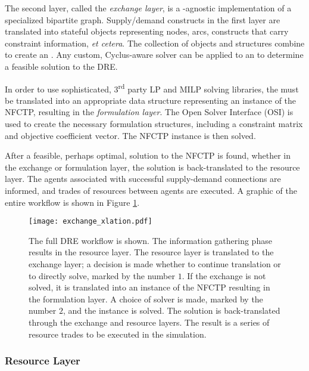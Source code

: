 The second layer, called the \textit{exchange layer}, is a
-agnostic implementation of a specialized bipartite
graph. Supply/demand constructs in the first layer are translated into stateful
objects representing nodes, arcs, constructs that carry constraint information,
\textit{et cetera}. The collection of objects and structures combine to create
an . Any custom, Cyclus-aware solver can be applied to an
 to determine a feasible solution to the DRE.

In order to use sophisticated, 3\textsuperscript{rd} party LP and MILP solving
libraries, the  must be translated into an appropriate data
structure representing an instance of the NFCTP, resulting in the
\textit{formulation layer}. The Open Solver Interface (OSI) \cite{coinosi} is
used to create the necessary formulation structures, including a constraint
matrix and objective coefficient vector. The NFCTP instance is then solved.

After a feasible, perhaps optimal, solution to the NFCTP is found, whether in
the exchange or formulation layer, the solution is back-translated to the
resource layer. The agents associated with successful supply-demand connections
are informed, and trades of resources between agents are executed. A graphic of
the entire workflow is shown in Figure \ref{fig:dre_impl}.

\begin{figure}
  \begin{center}
    \texttt{[image: exchange\_xlation.pdf]}
    \caption[]{
      \label{fig:dre_impl}
      The full DRE workflow is shown. The information gathering phase results in
      the resource layer. The resource layer is translated to the exchange
      layer; a decision is made whether to continue translation or to directly
      solve, marked by the number $1$. If the exchange is not solved, it is
      translated into an instance of the NFCTP resulting in the formulation
      layer. A choice of solver is made, marked by the number $2$, and the
      instance is solved.  The solution is back-translated through the exchange
      and resource layers. The result is a series of resource trades to be
      executed in the simulation.}
  \end{center}
\end{figure}

\subsubsection{Resource Layer}

